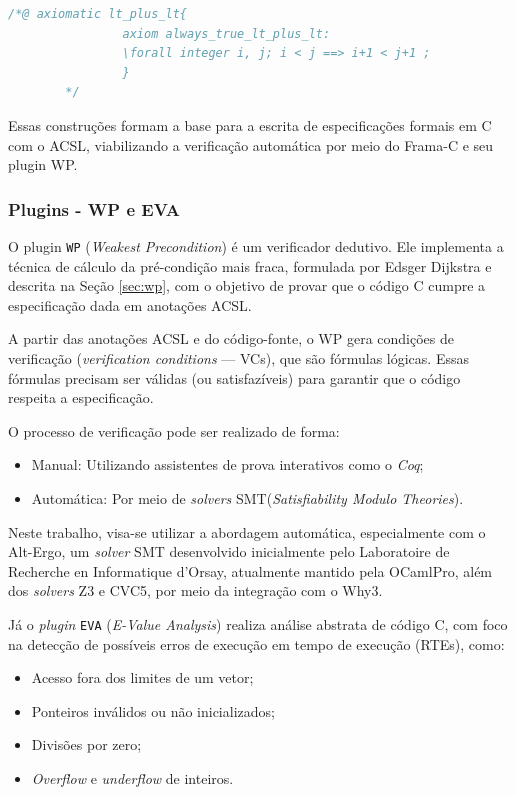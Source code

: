 \documentclass{article}
\begin{document}
\begin{lstlisting}[language=C]
        /*@ axiomatic lt_plus_lt{ 
                axiom always_true_lt_plus_lt: 
                \forall integer i, j; i < j ==> i+1 < j+1 ;
                }
        */ 
\end{lstlisting}

Essas construções formam a base para a escrita de especificações formais em C com o ACSL, viabilizando a verificação automática por meio do Frama-C e seu plugin WP.



\subsubsection{Plugins - WP e EVA}

O plugin \texttt{WP} (\emph{Weakest Precondition}) é um verificador dedutivo. Ele implementa a técnica de cálculo da pré-condição mais fraca, formulada por Edsger Dijkstra e descrita na Seção \ref{sec:wp}, com o objetivo de provar que o código C cumpre a especificação dada em anotações ACSL.

A partir das anotações ACSL e do código-fonte, o WP gera condições de verificação (\emph{verification conditions} — VCs), que são fórmulas lógicas. Essas fórmulas precisam ser válidas (ou satisfazíveis) para garantir que o código respeita a especificação. 

O processo de verificação pode ser realizado de forma:
\begin{itemize}
    \item Manual: Utilizando assistentes de prova interativos como o \textit{Coq};
    \item Automática: Por meio de \emph{solvers} SMT(\textit{Satisfiability Modulo Theories}).
\end{itemize}

Neste trabalho, visa-se utilizar a abordagem automática, especialmente com o Alt-Ergo, um \emph{solver} SMT desenvolvido inicialmente pelo Laboratoire de Recherche en Informatique d’Orsay, atualmente mantido pela OCamlPro, além dos \emph{solvers} Z3 e CVC5, por meio da integração com o Why3.

Já o \emph{plugin} \texttt{EVA} (\textit{E-Value Analysis}) realiza análise abstrata de código C, com foco na detecção de possíveis erros de execução em tempo de execução (RTEs), como:
\begin{itemize}
    \item Acesso fora dos limites de um vetor;
    \item Ponteiros inválidos ou não inicializados;
    \item Divisões por zero;
    \item \emph{Overflow} e \emph{underflow} de inteiros.
\end{itemize}
\end{document}
